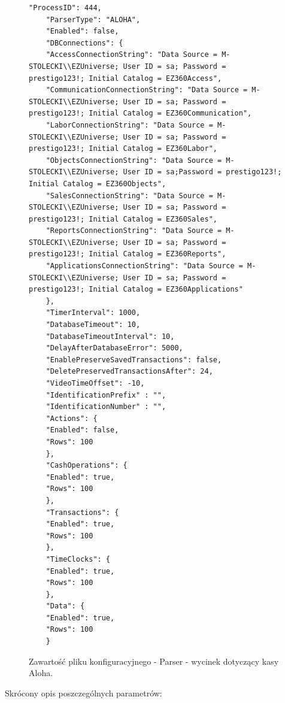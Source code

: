 \documentclass[a4paper]{book}
\begin{document}
\begin{figure}[h]
	\begin{lstlisting}[frame=single, breaklines=true]
	"ProcessID": 444,
	"ParserType": "ALOHA",
	"Enabled": false,
	"DBConnections": {
	"AccessConnectionString": "Data Source = M-STOLECKI\\EZUniverse; User ID = sa; Password = prestigo123!; Initial Catalog = EZ360Access",
	"CommunicationConnectionString": "Data Source = M-STOLECKI\\EZUniverse; User ID = sa; Password = prestigo123!; Initial Catalog = EZ360Communication",
	"LaborConnectionString": "Data Source = M-STOLECKI\\EZUniverse; User ID = sa; Password = prestigo123!; Initial Catalog = EZ360Labor",
	"ObjectsConnectionString": "Data Source = M-STOLECKI\\EZUniverse; User ID = sa;Password = prestigo123!; Initial Catalog = EZ360Objects",
	"SalesConnectionString": "Data Source = M-STOLECKI\\EZUniverse; User ID = sa; Password = prestigo123!; Initial Catalog = EZ360Sales",
	"ReportsConnectionString": "Data Source = M-STOLECKI\\EZUniverse; User ID = sa; Password = prestigo123!; Initial Catalog = EZ360Reports",      
	"ApplicationsConnectionString": "Data Source = M-STOLECKI\\EZUniverse; User ID = sa; Password = prestigo123!; Initial Catalog = EZ360Applications"
	},
	"TimerInterval": 1000,
	"DatabaseTimeout": 10,
	"DatabaseTimeoutInterval": 10,
	"DelayAfterDatabaseError": 5000,
	"EnablePreserveSavedTransactions": false,
	"DeletePreservedTransactionsAfter": 24,
	"VideoTimeOffset": -10,
	"IdentificationPrefix" : "",
	"IdentificationNumber" : "",
	"Actions": {
	"Enabled": false,
	"Rows": 100
	},
	"CashOperations": {
	"Enabled": true,
	"Rows": 100
	},
	"Transactions": {
	"Enabled": true,
	"Rows": 100
	},
	"TimeClocks": {
	"Enabled": true,
	"Rows": 100
	},
	"Data": {
	"Enabled": true,
	"Rows": 100
	}
	\end{lstlisting}
	\caption{Zawartość pliku konfiguracyjnego - Parser - wycinek dotyczący kasy Aloha.}
	\label{lst:przykladowyPlikKonfiguracyjnyParser}
\end{figure}
Skrócony opis poszczególnych parametrów:
\end{document}
